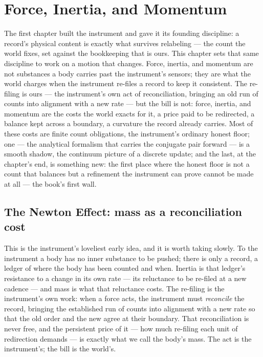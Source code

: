 \chapter{Force, Inertia, and Momentum}
\label{chap:force-inertia-momentum}

The first chapter built the instrument and gave it its founding discipline: a record's physical content is
exactly what survives relabeling --- the count the world fixes, set against the bookkeeping that is ours. This
chapter sets that same discipline to work on a motion that changes. Force, inertia, and momentum are not
substances a body carries past the instrument's sensors; they are what the world charges when the instrument
re-files a record to keep it consistent. The re-filing is ours --- the instrument's own act of reconciliation,
bringing an old run of counts into alignment with a new rate --- but the bill is not: force, inertia, and
momentum are the costs the world exacts for it, a price paid to be redirected, a balance kept across a
boundary, a curvature the record already carries. Most of these costs are finite count obligations, the
instrument's ordinary honest floor; one --- the analytical formalism that carries the conjugate pair forward
--- is a smooth shadow, the continuum picture of a discrete update; and the last, at the chapter's end, is
something new: the first place where the honest floor is not a count that balances but a refinement the
instrument can prove cannot be made at all --- the book's first wall.

\section{The Newton Effect: mass as a reconciliation cost}
\label{se:newton}

This is the instrument's loveliest early idea, and it is worth taking slowly. To the instrument a body has no
inner substance to be pushed; there is only a record, a ledger of where the body has been counted and when.
Inertia is that ledger's resistance to a change in its own rate --- its reluctance to be re-filed at a new
cadence --- and mass is what that reluctance costs. The re-filing is the instrument's own work: when a force
acts, the instrument must \emph{reconcile} the record, bringing the established run of counts into alignment
with a new rate so that the old order and the new agree at their boundary. That reconciliation is never free,
and the persistent price of it --- how much re-filing each unit of redirection demands --- is exactly what we
call the body's mass. The act is the instrument's; the bill is the world's.

